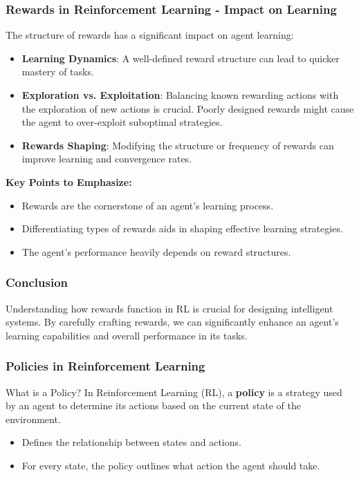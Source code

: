 \documentclass[aspectratio=169]{beamer}
\begin{document}
\begin{frame}[fragile]
    \frametitle{Rewards in Reinforcement Learning - Impact on Learning}
    The structure of rewards has a significant impact on agent learning:
    \begin{itemize}
        \item \textbf{Learning Dynamics}: A well-defined reward structure can lead to quicker mastery of tasks.
        \item \textbf{Exploration vs. Exploitation}: Balancing known rewarding actions with the exploration of new actions is crucial. Poorly designed rewards might cause the agent to over-exploit suboptimal strategies.
        \item \textbf{Rewards Shaping}: Modifying the structure or frequency of rewards can improve learning and convergence rates.
    \end{itemize}
    
    \textbf{Key Points to Emphasize:}
    \begin{itemize}
        \item Rewards are the cornerstone of an agent's learning process.
        \item Differentiating types of rewards aids in shaping effective learning strategies.
        \item The agent's performance heavily depends on reward structures.
    \end{itemize}
\end{frame}

\begin{frame}[fragile]
    \frametitle{Conclusion}
    Understanding how rewards function in RL is crucial for designing intelligent systems. 
    By carefully crafting rewards, we can significantly enhance an agent's learning capabilities and overall performance in its tasks.
\end{frame}

\begin{frame}[fragile]
    \frametitle{Policies in Reinforcement Learning}
    \begin{block}{What is a Policy?}
        In Reinforcement Learning (RL), a \textbf{policy} is a strategy used by an agent to determine its actions based on the current state of the environment. 
    \end{block}
    \begin{itemize}
        \item Defines the relationship between states and actions.
        \item For every state, the policy outlines what action the agent should take.
    \end{itemize}
\end{frame}
\end{document}
